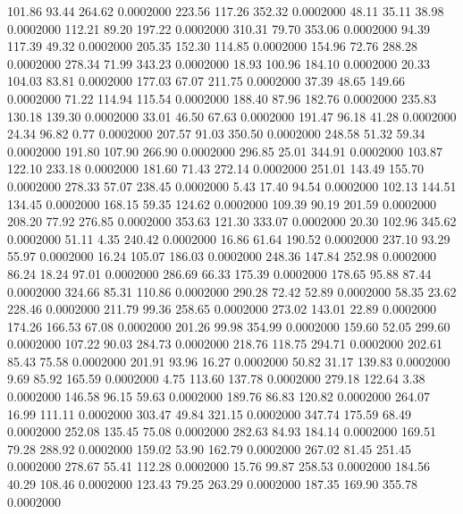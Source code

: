  101.86   93.44  264.62   0.0002000
 223.56  117.26  352.32   0.0002000
  48.11   35.11   38.98   0.0002000
 112.21   89.20  197.22   0.0002000
 310.31   79.70  353.06   0.0002000
  94.39  117.39   49.32   0.0002000
 205.35  152.30  114.85   0.0002000
 154.96   72.76  288.28   0.0002000
 278.34   71.99  343.23   0.0002000
  18.93  100.96  184.10   0.0002000
  20.33  104.03   83.81   0.0002000
 177.03   67.07  211.75   0.0002000
  37.39   48.65  149.66   0.0002000
  71.22  114.94  115.54   0.0002000
 188.40   87.96  182.76   0.0002000
 235.83  130.18  139.30   0.0002000
  33.01   46.50   67.63   0.0002000
 191.47   96.18   41.28   0.0002000
  24.34   96.82    0.77   0.0002000
 207.57   91.03  350.50   0.0002000
 248.58   51.32   59.34   0.0002000
 191.80  107.90  266.90   0.0002000
 296.85   25.01  344.91   0.0002000
 103.87  122.10  233.18   0.0002000
 181.60   71.43  272.14   0.0002000
 251.01  143.49  155.70   0.0002000
 278.33   57.07  238.45   0.0002000
   5.43   17.40   94.54   0.0002000
 102.13  144.51  134.45   0.0002000
 168.15   59.35  124.62   0.0002000
 109.39   90.19  201.59   0.0002000
 208.20   77.92  276.85   0.0002000
 353.63  121.30  333.07   0.0002000
  20.30  102.96  345.62   0.0002000
  51.11    4.35  240.42   0.0002000
  16.86   61.64  190.52   0.0002000
 237.10   93.29   55.97   0.0002000
  16.24  105.07  186.03   0.0002000
 248.36  147.84  252.98   0.0002000
  86.24   18.24   97.01   0.0002000
 286.69   66.33  175.39   0.0002000
 178.65   95.88   87.44   0.0002000
 324.66   85.31  110.86   0.0002000
 290.28   72.42   52.89   0.0002000
  58.35   23.62  228.46   0.0002000
 211.79   99.36  258.65   0.0002000
 273.02  143.01   22.89   0.0002000
 174.26  166.53   67.08   0.0002000
 201.26   99.98  354.99   0.0002000
 159.60   52.05  299.60   0.0002000
 107.22   90.03  284.73   0.0002000
 218.76  118.75  294.71   0.0002000
 202.61   85.43   75.58   0.0002000
 201.91   93.96   16.27   0.0002000
  50.82   31.17  139.83   0.0002000
   9.69   85.92  165.59   0.0002000
   4.75  113.60  137.78   0.0002000
 279.18  122.64    3.38   0.0002000
 146.58   96.15   59.63   0.0002000
 189.76   86.83  120.82   0.0002000
 264.07   16.99  111.11   0.0002000
 303.47   49.84  321.15   0.0002000
 347.74  175.59   68.49   0.0002000
 252.08  135.45   75.08   0.0002000
 282.63   84.93  184.14   0.0002000
 169.51   79.28  288.92   0.0002000
 159.02   53.90  162.79   0.0002000
 267.02   81.45  251.45   0.0002000
 278.67   55.41  112.28   0.0002000
  15.76   99.87  258.53   0.0002000
 184.56   40.29  108.46   0.0002000
 123.43   79.25  263.29   0.0002000
 187.35  169.90  355.78   0.0002000
